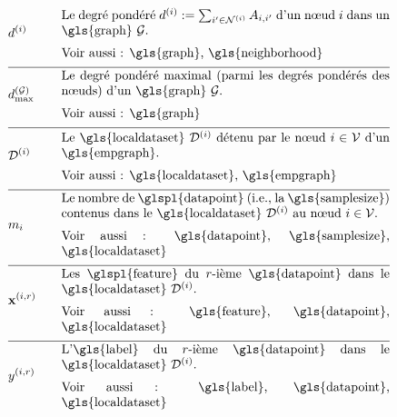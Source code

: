 \begin{align}
	&\nodedegree{\nodeidx} & \quad & \parbox{.75\textwidth}{
	Le degré pondéré $\nodedegree{\nodeidx}\defeq \sum_{\nodeidx' \in \neighbourhood{\nodeidx}} \edgeweight_{\nodeidx,\nodeidx'}$ d’un nœud $\nodeidx$ dans un \gls{graph} $\graph$. \\
	[2mm] Voir aussi : \gls{graph}, \gls{neighborhood}
	} \nonumber \\[2mm] \hline \nonumber\\[-5mm]
	&\maxnodedegree^{(\graph)} & \quad & \parbox{.75\textwidth}{
		Le degré pondéré maximal (parmi les degrés pondérés des nœuds) d’un \gls{graph} $\graph$. \\
		[2mm] Voir aussi : \gls{graph}
	} \nonumber \\[2mm] \hline \nonumber\\[-5mm]
	&\localdataset{\nodeidx} & \quad & \parbox{.75\textwidth}{
		Le \gls{localdataset} $\localdataset{\nodeidx}$ détenu par le nœud $\nodeidx\in \nodes$ d’un \gls{empgraph}. \\
		[2mm] Voir aussi : \gls{localdataset}, \gls{empgraph}
	} \nonumber \\[2mm] \hline \nonumber\\[-5mm]
	&\localsamplesize{\nodeidx} & \quad & \parbox{.75\textwidth}{
		Le nombre de \glspl{datapoint} (i.e., la \gls{samplesize}) contenus dans le \gls{localdataset} $\localdataset{\nodeidx}$ au nœud $\nodeidx \in \nodes$. \\
		[2mm] Voir aussi : \gls{datapoint}, \gls{samplesize}, \gls{localdataset}
	} \nonumber \\[2mm] \hline \nonumber\\[-5mm]
	&\featurevec^{(\nodeidx,\sampleidx)} & \quad & \parbox{.75\textwidth}{
		Les \glspl{feature} du $\sampleidx$-ième \gls{datapoint} dans le \gls{localdataset} $\localdataset{\nodeidx}$. \\
		[2mm] Voir aussi : \gls{feature}, \gls{datapoint}, \gls{localdataset}
	} \nonumber \\[2mm] \hline \nonumber\\[-5mm]
	&\truelabel^{(\nodeidx,\sampleidx)} & \quad & \parbox{.75\textwidth}{
		L'\gls{label} du $\sampleidx$-ième \gls{datapoint} dans le \gls{localdataset} $\localdataset{\nodeidx}$. \\
		[2mm] Voir aussi : \gls{label}, \gls{datapoint}, \gls{localdataset}
	} \nonumber
\end{align}

